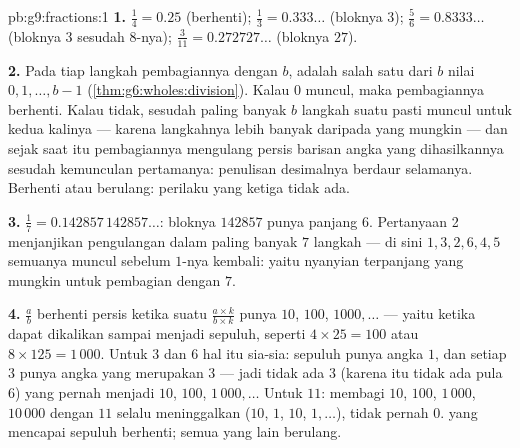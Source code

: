 \begin{solution}{pb:g9:fractions:1}
\textbf{1.} $\frac14 = 0.25$ (berhenti); $\frac13 = 0.333\ldots$
(bloknya $3$); $\frac56 = 0.8333\ldots$ (bloknya $3$ sesudah
$8$-nya); $\frac{3}{11} = 0.272727\ldots$ (bloknya $27$).

\textbf{2.} Pada tiap langkah pembagiannya dengan $b$, 
adalah salah satu dari $b$ nilai $0, 1, \dots, b - 1$
(\cref{thm:g6:wholes:division}). Kalau  $0$ muncul, maka
pembagiannya berhenti. Kalau tidak, sesudah paling banyak $b$ langkah
suatu  pasti muncul untuk kedua kalinya --- karena langkahnya
lebih banyak daripada  yang mungkin --- dan sejak saat itu
pembagiannya mengulang persis barisan angka yang dihasilkannya
sesudah kemunculan pertamanya: penulisan desimalnya berdaur selamanya.
Berhenti atau berulang: perilaku yang ketiga tidak ada.

\textbf{3.} $\frac17 = 0.142857\,142857\ldots$: bloknya
$142857$ punya panjang $6$. Pertanyaan 2 menjanjikan pengulangan dalam
paling banyak $7$ langkah --- di sini 
$1, 3, 2, 6, 4, 5$ semuanya muncul sebelum $1$-nya kembali: yaitu
nyanyian terpanjang yang mungkin untuk pembagian dengan $7$.

\textbf{4.} $\frac ab$ berhenti persis ketika suatu
$\frac{a \times k}{b \times k}$ punya  $10$, $100$,
$1000, \dots$ --- yaitu ketika  dapat
dikalikan sampai menjadi  sepuluh, seperti $4 \times 25 = 100$
atau $8 \times 125 = 1\,000$. Untuk $3$ dan $6$ hal itu sia-sia:
 sepuluh punya  angka $1$, dan setiap  $3$ punya
 angka yang merupakan  $3$ --- jadi tidak ada 
$3$ (karena itu tidak ada pula  $6$) yang pernah menjadi
$10$, $100$, $1\,000, \dots$ Untuk
$11$: membagi $10$, $100$, $1\,000$, $10\,000$ dengan $11$ selalu
meninggalkan  ($10$, $1$, $10$, $1, \dots$), tidak pernah $0$.
 yang mencapai  sepuluh berhenti; semua yang lain berulang.


\end{solution}
